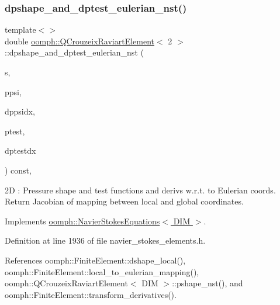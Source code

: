 \subsubsection{\texorpdfstring{dpshape\+\_\+and\+\_\+dptest\+\_\+eulerian\+\_\+nst()}{dpshape\_and\_dptest\_eulerian\_nst()}\hspace{0.1cm}{\footnotesize\ttfamily [2/3]}}
{\footnotesize\ttfamily template$<$$>$ \\
double \hyperlink{classoomph_1_1QCrouzeixRaviartElement}{oomph\+::\+Q\+Crouzeix\+Raviart\+Element}$<$ 2 $>$\+::dpshape\+\_\+and\+\_\+dptest\+\_\+eulerian\+\_\+nst (\begin{DoxyParamCaption}\item[{const \hyperlink{classoomph_1_1Vector}{Vector}$<$ double $>$ \&}]{s,  }\item[{\hyperlink{classoomph_1_1Shape}{Shape} \&}]{ppsi,  }\item[{\hyperlink{classoomph_1_1DShape}{D\+Shape} \&}]{dppsidx,  }\item[{\hyperlink{classoomph_1_1Shape}{Shape} \&}]{ptest,  }\item[{\hyperlink{classoomph_1_1DShape}{D\+Shape} \&}]{dptestdx }\end{DoxyParamCaption}) const\hspace{0.3cm}{\ttfamily [inline]}, {\ttfamily [virtual]}}

2D \+: Pressure shape and test functions and derivs w.\+r.\+t. to Eulerian coords. Return Jacobian of mapping between local and global coordinates. 

Implements \hyperlink{classoomph_1_1NavierStokesEquations_a2f3024a4d370ec45ddffacb236bc2bb2}{oomph\+::\+Navier\+Stokes\+Equations$<$ D\+I\+M $>$}.



Definition at line 1936 of file navier\+\_\+stokes\+\_\+elements.\+h.



References oomph\+::\+Finite\+Element\+::dshape\+\_\+local(), oomph\+::\+Finite\+Element\+::local\+\_\+to\+\_\+eulerian\+\_\+mapping(), oomph\+::\+Q\+Crouzeix\+Raviart\+Element$<$ D\+I\+M $>$\+::pshape\+\_\+nst(), and oomph\+::\+Finite\+Element\+::transform\+\_\+derivatives().

\mbox{\label{classoomph_1_1QCrouzeixRaviartElement_af007dc64ad3b51f244e4b1bdcb374492}} 
